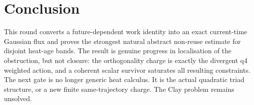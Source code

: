 \documentclass[11pt]{article}
\theoremstyle{remark}
\begin{document}
\section*{Conclusion}

This round converts a future-dependent work identity into an exact
current-time Gaussian flux and proves the strongest natural abstract
non-reuse estimate for disjoint heat-age bands.  The result is genuine
progress in localisation of the obstruction, but not closure: the
orthogonality charge is exactly the divergent q4 weighted action, and a
coherent scalar survivor saturates all resulting constraints.  The next
gate is no longer generic heat calculus.  It is the actual quadratic
triad structure, or a new finite same-trajectory charge.  The Clay
problem remains unsolved.
\end{document}
